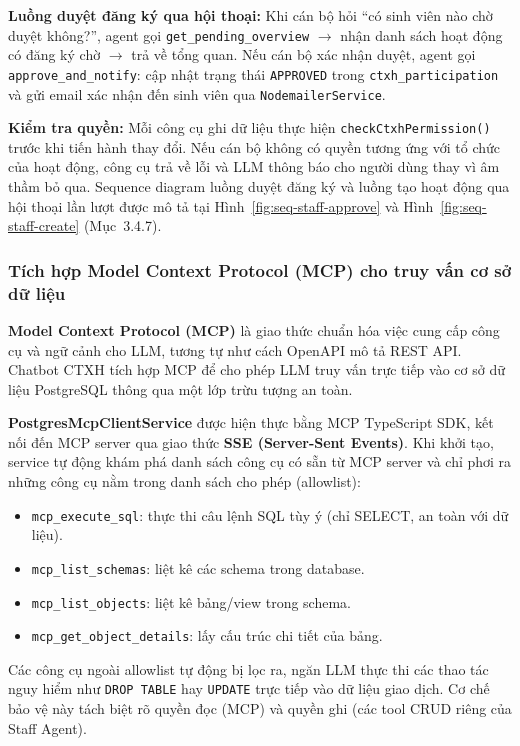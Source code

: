 \textbf{Luồng duyệt đăng ký qua hội thoại:} Khi cán bộ hỏi ``có sinh viên nào chờ duyệt không?'', agent gọi \texttt{get\_pending\_overview} $\rightarrow$ nhận danh sách hoạt động có đăng ký chờ $\rightarrow$ trả về tổng quan. Nếu cán bộ xác nhận duyệt, agent gọi \texttt{approve\_and\_notify}: cập nhật trạng thái \texttt{APPROVED} trong \texttt{ctxh\_participation} và gửi email xác nhận đến sinh viên qua \texttt{NodemailerService}.

\textbf{Kiểm tra quyền:} Mỗi công cụ ghi dữ liệu thực hiện \texttt{checkCtxhPermission()} trước khi tiến hành thay đổi. Nếu cán bộ không có quyền tương ứng với tổ chức của hoạt động, công cụ trả về lỗi và LLM thông báo cho người dùng thay vì âm thầm bỏ qua. Sequence diagram luồng duyệt đăng ký và luồng tạo hoạt động qua hội thoại lần lượt được mô tả tại Hình~\ref{fig:seq-staff-approve} và Hình~\ref{fig:seq-staff-create} (Mục~3.4.7).

\subsubsection{Tích hợp Model Context Protocol (MCP) cho truy vấn cơ sở dữ liệu}
\textbf{Model Context Protocol (MCP)} là giao thức chuẩn hóa việc cung cấp công cụ và ngữ cảnh cho LLM, tương tự như cách OpenAPI mô tả REST API. Chatbot CTXH tích hợp MCP để cho phép LLM truy vấn trực tiếp vào cơ sở dữ liệu PostgreSQL thông qua một lớp trừu tượng an toàn.

\textbf{PostgresMcpClientService} được hiện thực bằng MCP TypeScript SDK, kết nối đến MCP server qua giao thức \textbf{SSE (Server-Sent Events)}. Khi khởi tạo, service tự động khám phá danh sách công cụ có sẵn từ MCP server và chỉ phơi ra những công cụ nằm trong danh sách cho phép (allowlist):

\begin{itemize}
	\item \texttt{mcp\_execute\_sql}: thực thi câu lệnh SQL tùy ý (chỉ SELECT, an toàn với dữ liệu).
	\item \texttt{mcp\_list\_schemas}: liệt kê các schema trong database.
	\item \texttt{mcp\_list\_objects}: liệt kê bảng/view trong schema.
	\item \texttt{mcp\_get\_object\_details}: lấy cấu trúc chi tiết của bảng.
\end{itemize}

Các công cụ ngoài allowlist tự động bị lọc ra, ngăn LLM thực thi các thao tác nguy hiểm như \texttt{DROP TABLE} hay \texttt{UPDATE} trực tiếp vào dữ liệu giao dịch. Cơ chế bảo vệ này tách biệt rõ quyền đọc (MCP) và quyền ghi (các tool CRUD riêng của Staff Agent).

